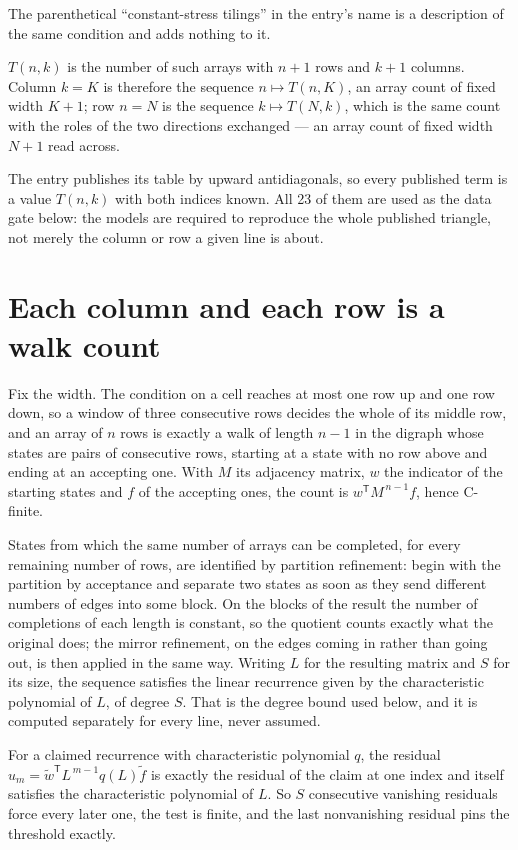 \documentclass[11pt]{article}
\theoremstyle{definition}
\begin{document}
The parenthetical ``constant-stress tilings'' in the entry's name is a description of the same condition and adds nothing to it.

$T(n,k)$ is the number of such arrays with $n + 1$ rows and $k + 1$ columns. Column $k = K$ is therefore the sequence $n \mapsto T(n,K)$, an array count of fixed width $K + 1$; row $n = N$ is the sequence $k \mapsto T(N,k)$, which is the same count with the roles of the two directions exchanged --- an array count of fixed width $N + 1$ read across.

The entry publishes its table by upward antidiagonals, so every published term is a value $T(n,k)$ with both indices known. All 23 of them are used as the data gate below: the models are required to reproduce the whole published triangle, not merely the column or row a given line is about.

\section{Each column and each row is a walk count}

Fix the width. The condition on a cell reaches at most one row up and one row down, so a window of three consecutive rows decides the whole of its middle row, and an array of $n$ rows is exactly a walk of length $n-1$ in the digraph whose states are pairs of consecutive rows, starting at a state with no row above and ending at an accepting one. With $M$ its adjacency matrix, $w$ the indicator of the starting states and $f$ of the accepting ones, the count is $w^{\mathsf T}M^{\,n-1}f$, hence C-finite.

States from which the same number of arrays can be completed, for every remaining number of rows, are identified by partition refinement: begin with the partition by acceptance and separate two states as soon as they send different numbers of edges into some block. On the blocks of the result the number of completions of each length is constant, so the quotient counts exactly what the original does; the mirror refinement, on the edges coming in rather than going out, is then applied in the same way. Writing $L$ for the resulting matrix and $S$ for its size, the sequence satisfies the linear recurrence given by the characteristic polynomial of $L$, of degree $S$. That is the degree bound used below, and it is computed separately for every line, never assumed.

For a claimed recurrence with characteristic polynomial $q$, the residual $u_m = \tilde w^{\mathsf T}L^{\,m-1}q(L)\tilde f$ is exactly the residual of the claim at one index and itself satisfies the characteristic polynomial of $L$. So $S$ consecutive vanishing residuals force every later one, the test is finite, and the last nonvanishing residual pins the threshold exactly.
\end{document}
